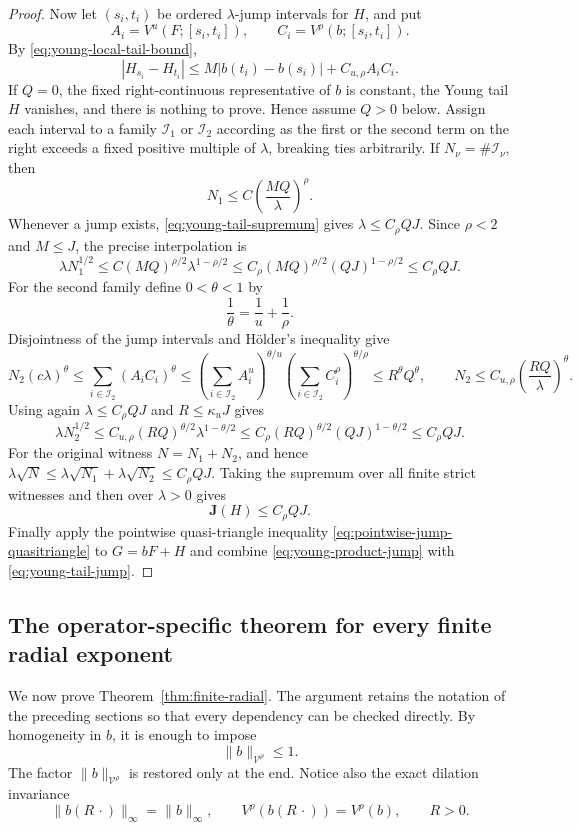 \documentclass[11pt]{article}
\numberwithin{equation}{section}
\theoremstyle{remark}
\theoremstyle{definition}
\begin{document}
\begin{proof}
Now let $(s_i,t_i)$ be ordered $\lambda$-jump intervals for $H$, and put
\[
 A_i=V^u(F;[s_i,t_i]),\qquad C_i=V^\rho(b;[s_i,t_i]).
\]
By \eqref{eq:young-local-tail-bound},
\[
 |H_{s_i}-H_{t_i}|
 \le M|b(t_i)-b(s_i)|+C_{u,\rho}A_iC_i.
\]
If $Q=0$, the fixed right-continuous representative of $b$ is constant,
the Young tail $H$ vanishes, and there is nothing to prove.  Hence assume
$Q>0$ below.
Assign each interval to a family $\mathcal I_1$ or $\mathcal I_2$
according as the first or the second term on the right exceeds a fixed
positive multiple of $\lambda$, breaking ties arbitrarily.  If
$N_\nu=\#\mathcal I_\nu$, then
\[
 N_1\le C\left(\frac{MQ}{\lambda}\right)^\rho.
\]
Whenever a jump exists, \eqref{eq:young-tail-supremum} gives
$\lambda\le C_\rho QJ$.  Since $\rho<2$ and $M\le J$, the precise
interpolation is
\[
 \lambda N_1^{1/2}
 \le C(MQ)^{\rho/2}\lambda^{1-\rho/2}
 \le C_\rho(MQ)^{\rho/2}(QJ)^{1-\rho/2}
 \le C_\rho QJ.
\]
For the second family define $0<\theta<1$ by
\[
 \frac1\theta=\frac1u+\frac1\rho.
\]
Disjointness of the jump intervals and H\"older's inequality give
\[
 N_2(c\lambda)^\theta
 \le\sum_{i\in\mathcal I_2}(A_iC_i)^\theta
 \le
 \left(\sum_{i\in\mathcal I_2}A_i^u\right)^{\theta/u}
 \left(\sum_{i\in\mathcal I_2}C_i^\rho\right)^{\theta/\rho}
 \le R^\theta Q^\theta,
 \qquad
 N_2\le C_{u,\rho}\left(\frac{RQ}{\lambda}\right)^\theta.
\]
Using again $\lambda\le C_\rho QJ$ and $R\le\kappa_uJ$ gives
\[
 \lambda N_2^{1/2}
 \le C_{u,\rho}(RQ)^{\theta/2}\lambda^{1-\theta/2}
 \le C_\rho(RQ)^{\theta/2}(QJ)^{1-\theta/2}
 \le C_\rho QJ.
\]
For the original witness $N=N_1+N_2$, and hence
$\lambda\sqrt N\le\lambda\sqrt{N_1}+\lambda\sqrt{N_2}\le C_\rho QJ$.
Taking the supremum over all finite strict witnesses and then over
$\lambda>0$ gives
\begin{equation}\label{eq:young-tail-jump}
 \mathbf J(H)\le C_\rho QJ.
\end{equation}
Finally apply the pointwise quasi-triangle inequality
\eqref{eq:pointwise-jump-quasitriangle} to $G=bF+H$ and combine
\eqref{eq:young-product-jump} with \eqref{eq:young-tail-jump}.
\end{proof}


\subsection{The operator-specific theorem for every finite radial exponent}

We now prove Theorem~\ref{thm:finite-radial}.  The argument retains the
notation of the preceding sections so that every dependency can be checked
directly.  By homogeneity in $b$, it is enough to impose
\begin{equation}\label{eq:allq-normalize-b}
 \|b\|_{\mathcal V^\rho}\le1.
\end{equation}
The factor $\|b\|_{\mathcal V^\rho}$ is restored only at the end.  Notice
also the exact dilation invariance
\begin{equation}\label{eq:allq-dilation-b}
 \|b(R\,\cdot)\|_\infty=\|b\|_\infty,
 \qquad V^\rho(b(R\,\cdot))=V^\rho(b),
 \qquad R>0.
\end{equation}
\end{document}
